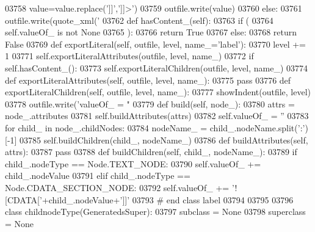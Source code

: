 \begin{DoxyCode}
{{{{{{{{{{{{{{{{{{{{{{{{{{{{{{{{{{{{{{{{{{{{{{{{{{{{{{{{{{{{{{{{{{{{{{{{{{{{{{{{{{{{{{{{{{{{{{{{{{{{{{{{{{{{{{{{{{{{{{{{{{{{{{{{{{{{{{{{{{{{{{{{{{{{{{{{{{{{{{{{{{{{{{{{{{{{{{{{{{{{{{{{{{{{{{{{{{{{{{{{{{{{{{{{{{{{{{{{{{{{{{{{{{{{{{{{{{{{{{{{{03758             value=value.replace(\textcolor{stringliteral}{']]'},\textcolor{stringliteral}{']]>'})
03759             outfile.write(value)
03760         \textcolor{keywordflow}{else}:
03761             outfile.write(quote_xml(\textcolor{stringliteral}{'%
03762     \textcolor{keyword}{def }hasContent_(self):
03763         \textcolor{keywordflow}{if} (
03764             self.valueOf_ \textcolor{keywordflow}{is} \textcolor{keywordflow}{not} \textcolor{keywordtype}{None}
03765             ):
03766             \textcolor{keywordflow}{return} \textcolor{keyword}{True}
03767         \textcolor{keywordflow}{else}:
03768             \textcolor{keywordflow}{return} \textcolor{keyword}{False}
03769     \textcolor{keyword}{def }exportLiteral(self, outfile, level, name\_='label'):
03770         level += 1
03771         self.exportLiteralAttributes(outfile, level, name\_)
03772         \textcolor{keywordflow}{if} self.hasContent_():
03773             self.exportLiteralChildren(outfile, level, name\_)
03774     \textcolor{keyword}{def }exportLiteralAttributes(self, outfile, level, name\_):
03775         \textcolor{keywordflow}{pass}
03776     \textcolor{keyword}{def }exportLiteralChildren(self, outfile, level, name\_):
03777         showIndent(outfile, level)
03778         outfile.write(\textcolor{stringliteral}{'valueOf\_ = "%
03779     \textcolor{keyword}{def }build(self, node\_):
03780         attrs = node\_.attributes
03781         self.buildAttributes(attrs)
03782         self.valueOf_ = \textcolor{stringliteral}{''}
03783         \textcolor{keywordflow}{for} child\_ \textcolor{keywordflow}{in} node\_.childNodes:
03784             nodeName\_ = child\_.nodeName.split(\textcolor{stringliteral}{':'})[-1]
03785             self.buildChildren(child\_, nodeName\_)
03786     \textcolor{keyword}{def }buildAttributes(self, attrs):
03787         \textcolor{keywordflow}{pass}
03788     \textcolor{keyword}{def }buildChildren(self, child\_, nodeName\_):
03789         \textcolor{keywordflow}{if} child\_.nodeType == Node.TEXT\_NODE:
03790             self.valueOf\_ += child\_.nodeValue
03791         \textcolor{keywordflow}{elif} child\_.nodeType == Node.CDATA\_SECTION\_NODE:
03792             self.valueOf\_ += \textcolor{stringliteral}{'![CDATA['}+child\_.nodeValue+\textcolor{stringliteral}{']]'}
03793 \textcolor{comment}{# end class label}
03794 
03795 
03796 \textcolor{keyword}{class }childnodeType(GeneratedsSuper):
03797     subclass = \textcolor{keywordtype}{None}
03798     superclass = \textcolor{keywordtype}{None}
}}}}}}}}}}}}}}}}}}}}}}}}}}}}}}}}}}}}}}}}}}}}}}}}}}}}}}}}}}}}}}}}}}}}}}}}}}}}}}}}}}}}}}}}}}}}}}}}}}}}}}}}}}}}}}}}}}}}}}}}}}}}}}}}}}}}}}}}}}}}}}}}}}}}}}}}}}}}}}}}}}}}}}}}}}}}}}}}}}}}}}}}}}}}}}}}}}}}}}}}}}}}}}}}}}}}}}}}}}}}}}}}}}}}}}}}}}}}}}}}}}}
\end{DoxyCode}
